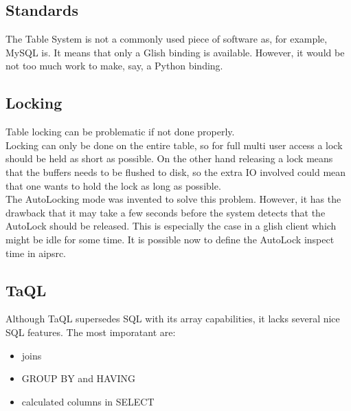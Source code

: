\subsection{Standards}
The Table System is not a commonly used piece of software as, for
example, MySQL is. It means that only a Glish binding is available.
However, it would be not too much work to make, say, a Python binding.

\subsection{Locking}
Table locking can be problematic if not done properly.
\\Locking can only be done on the entire table, so for full multi user
access a lock should be held as short as possible. On the other hand
releasing a lock means that the buffers needs to be flushed to disk,
so the extra IO involved could mean that one wants to hold the lock
as long as possible.
\\The AutoLocking mode was invented to solve this problem. However,
it has the drawback that it may take a few seconds before the system
detects that the AutoLock should be released. This is especially the
case in a glish client which might be idle for some time. It is
possible now to define the AutoLock inspect time in aipsrc.

\subsection{TaQL}
Although TaQL supersedes SQL with its array capabilities, it lacks
several nice SQL features. The most imporatant are:
\begin{itemize}
\item joins
\item GROUP BY and HAVING
\item calculated columns in SELECT
\end{itemize}
